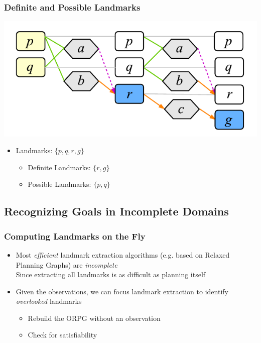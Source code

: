 \documentclass{beamer}
\begin{document}
\newcommand{\set}[1]{\{#1\}}

\begin{frame}[c]\frametitle{Definite and Possible Landmarks}
	\begin{center}
		\vspace{-2em}
		\includegraphics[width=.55\textwidth]{fig/ORPG-Example.pdf}
	\end{center}
	\vspace{-1.5em}
	\begin{itemize}
		\item Landmarks: $\set{p,q,r,g}$
		\begin{itemize}
			\item Definite Landmarks: $\set{r,g}$
			\item Possible Landmarks: $\set{p,q}$
		\end{itemize}
	\end{itemize}
\end{frame}

\subsection{Recognizing Goals in Incomplete Domains}

\begin{frame}[c]\frametitle{Computing Landmarks on the Fly}
\begin{itemize}
	\item Most \emph{efficient} landmark extraction algorithms (e.g. based on Relaxed Planning Graphs) are \emph{incomplete}\\
	Since extracting all landmarks is as difficult as planning itself
	\item Given the observations, we can focus landmark extraction to identify \emph{overlooked} landmarks 
	\begin{itemize}
		\item Rebuild the ORPG without an observation
		\item Check for satisfiability
	\end{itemize}
\end{itemize}
\end{frame}
\end{document}
